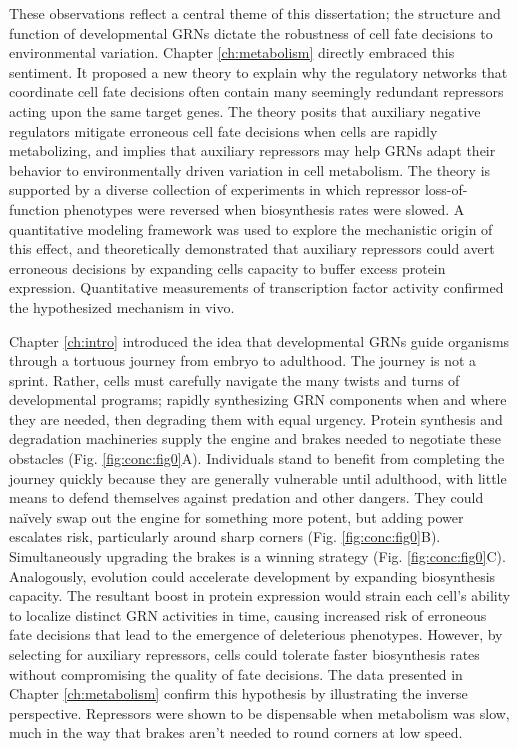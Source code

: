 These observations reflect a central theme of this dissertation; the structure and function of developmental GRNs dictate the robustness of cell fate decisions to environmental variation. Chapter \ref{ch:metabolism} directly embraced this sentiment. It proposed a new theory to explain why the regulatory networks that coordinate cell fate decisions often contain many seemingly redundant repressors acting upon the same target genes. The theory posits that auxiliary negative regulators mitigate erroneous cell fate decisions when cells are rapidly metabolizing, and implies that auxiliary repressors may help GRNs adapt their behavior to environmentally driven variation in cell metabolism. The theory is supported by a diverse collection of experiments in which repressor loss-of-function phenotypes were reversed when biosynthesis rates were slowed. A quantitative modeling framework was used to explore the mechanistic origin of this effect, and theoretically demonstrated that auxiliary repressors could avert erroneous decisions by expanding cells capacity to buffer excess protein expression. Quantitative measurements of transcription factor activity confirmed the hypothesized mechanism in vivo.

Chapter \ref{ch:intro} introduced the idea that developmental GRNs guide organisms through a tortuous journey from embryo to adulthood. The journey is not a sprint. Rather, cells must carefully navigate the many twists and turns of developmental programs; rapidly synthesizing GRN components when and where they are needed, then degrading them with equal urgency. Protein synthesis and degradation machineries supply the engine and brakes needed to negotiate these obstacles (Fig. \ref{fig:conc:fig0}A). Individuals stand to benefit from completing the journey quickly because they are generally vulnerable until adulthood, with little means to defend themselves against predation and other dangers. They could na\"ively swap out the engine for something more potent, but adding power escalates risk, particularly around sharp corners (Fig. \ref{fig:conc:fig0}B). Simultaneously upgrading the brakes is a winning strategy (Fig. \ref{fig:conc:fig0}C). Analogously, evolution could accelerate development by expanding biosynthesis capacity. The resultant boost in protein expression would strain each cell's ability to localize distinct GRN activities in time, causing increased risk of erroneous fate decisions that lead to the emergence of deleterious phenotypes. However, by selecting for auxiliary repressors, cells could tolerate faster biosynthesis rates without compromising the quality of fate decisions. The data presented in Chapter \ref{ch:metabolism} confirm this hypothesis by illustrating the inverse perspective. Repressors were shown to be dispensable when metabolism was slow, much in the way that brakes aren't needed to round corners at low speed.


